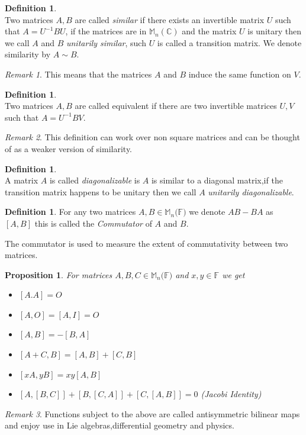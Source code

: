 \documentclass[12pt]{article}
\newtheorem{prop}[theorem]{Proposition}
\theoremstyle{definition}
\newtheorem{definition}[theorem]{Definition}
\theoremstyle{remark}
\newtheorem*{remark}{Remark}
\theoremstyle{plain}
\begin{document}
\begin{definition}\leavevmode \\
	Two matrices $A,B$ are called \textit{similar} if there exists an invertible matrix $ U $ such that $A=U^{-1}BU$, if the matrices are in $\mathbb{M}_n(\mathbb{C})$ and the matrix $U$ is unitary then we call $A$ and $B$ \textit{unitarily similar}, such $U$ is called a transition matrix. We denote similarity by $A \sim B$.
\end{definition}
\begin{remark}
	This means that the matrices $A$ and $B$ induce the same function on $V$. 
\end{remark}
\begin{definition}\leavevmode \\
	Two matrices $A,B$ are called equivalent if there are two invertible matrices $U,V$ such that $A=U^{-1}BV$.
\end{definition}
\begin{remark}
	This definition can work over non square matrices and can be thought of as a weaker version of similarity.
\end{remark}

\begin{definition}\leavevmode \\
	A matrix $A$ is called \textit{diagonalizable} is $A$ is similar to a diagonal matrix,if the transition matrix happens to be unitary then we call $A$ \textit{unitarily diagonalizable}.	
\end{definition}
\begin{definition}
    For any two matrices $A,B\in \mathbb{M}_n(\mathbb{F)}$ we denote $AB-BA$ as $[A,B]$ this is called the \textit{Commutator} of $A$ and $B$.
\end{definition}
The commutator is used to measure the extent of commutativity between two matrices.
\begin{prop}
    For matrices $A,B,C\in \mathbb{M}_n(\mathbb{F)}$ and $x,y \in \mathbb{F}$ we get
    \begin{itemize}
        \item $[A.A]=O$
        \item $[A,O]=[A,I]=O$
        \item $[A,B]=-[B,A]$
        \item $[A+C,B]=[A,B]+[C,B]$
        \item $[x A,y B]=xy[A,B]$
        \item $[A,[B,C]]+[B,[C,A]]+[C,[A,B]]=0$  \textup{(Jacobi Identity)}
        \end{itemize}
\end{prop}
\begin{remark}
    Functions subject to the above are called antisymmetric bilinear maps and enjoy use in Lie algebras,differential geometry and physics. 
\end{remark}
\newpage
\end{document}
